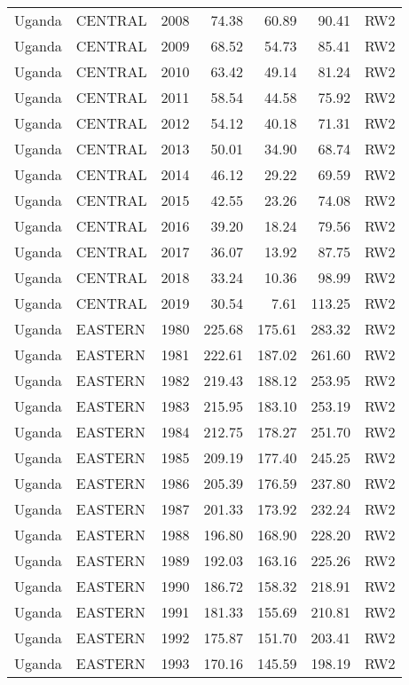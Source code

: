 \begin{longtable}{lllrrrl}
  Uganda & CENTRAL & 2008 & 74.38 & 60.89 & 90.41 & RW2 \\ 
  Uganda & CENTRAL & 2009 & 68.52 & 54.73 & 85.41 & RW2 \\ 
  Uganda & CENTRAL & 2010 & 63.42 & 49.14 & 81.24 & RW2 \\ 
  Uganda & CENTRAL & 2011 & 58.54 & 44.58 & 75.92 & RW2 \\ 
  Uganda & CENTRAL & 2012 & 54.12 & 40.18 & 71.31 & RW2 \\ 
  Uganda & CENTRAL & 2013 & 50.01 & 34.90 & 68.74 & RW2 \\ 
  Uganda & CENTRAL & 2014 & 46.12 & 29.22 & 69.59 & RW2 \\ 
  Uganda & CENTRAL & 2015 & 42.55 & 23.26 & 74.08 & RW2 \\ 
  Uganda & CENTRAL & 2016 & 39.20 & 18.24 & 79.56 & RW2 \\ 
  Uganda & CENTRAL & 2017 & 36.07 & 13.92 & 87.75 & RW2 \\ 
  Uganda & CENTRAL & 2018 & 33.24 & 10.36 & 98.99 & RW2 \\ 
  Uganda & CENTRAL & 2019 & 30.54 & 7.61 & 113.25 & RW2 \\ 
  Uganda & EASTERN & 1980 & 225.68 & 175.61 & 283.32 & RW2 \\ 
  Uganda & EASTERN & 1981 & 222.61 & 187.02 & 261.60 & RW2 \\ 
  Uganda & EASTERN & 1982 & 219.43 & 188.12 & 253.95 & RW2 \\ 
  Uganda & EASTERN & 1983 & 215.95 & 183.10 & 253.19 & RW2 \\ 
  Uganda & EASTERN & 1984 & 212.75 & 178.27 & 251.70 & RW2 \\ 
  Uganda & EASTERN & 1985 & 209.19 & 177.40 & 245.25 & RW2 \\ 
  Uganda & EASTERN & 1986 & 205.39 & 176.59 & 237.80 & RW2 \\ 
  Uganda & EASTERN & 1987 & 201.33 & 173.92 & 232.24 & RW2 \\ 
  Uganda & EASTERN & 1988 & 196.80 & 168.90 & 228.20 & RW2 \\ 
  Uganda & EASTERN & 1989 & 192.03 & 163.16 & 225.26 & RW2 \\ 
  Uganda & EASTERN & 1990 & 186.72 & 158.32 & 218.91 & RW2 \\ 
  Uganda & EASTERN & 1991 & 181.33 & 155.69 & 210.81 & RW2 \\ 
  Uganda & EASTERN & 1992 & 175.87 & 151.70 & 203.41 & RW2 \\ 
  Uganda & EASTERN & 1993 & 170.16 & 145.59 & 198.19 & RW2 \\ 

\end{longtable}

